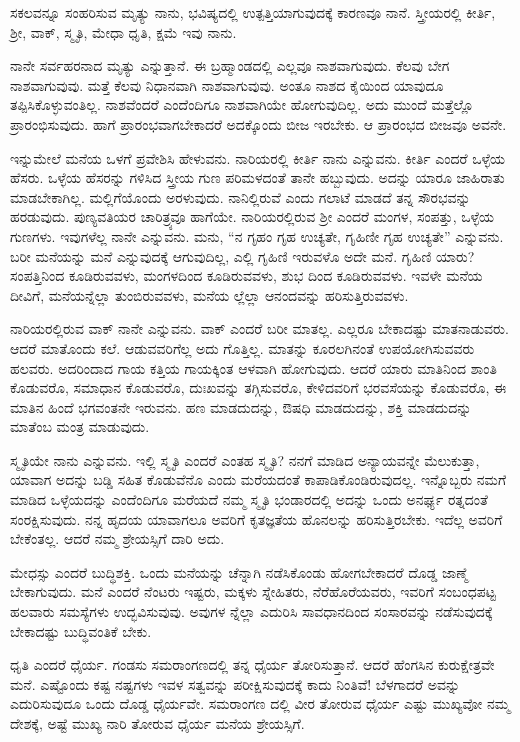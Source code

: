 {\small ಸಕಲವನ್ನೂ ಸಂಹರಿಸುವ ಮೃತ್ಯು ನಾನು, ಭವಿಷ್ಯದಲ್ಲಿ ಉತ್ಪತ್ತಿಯಾಗುವುದಕ್ಕೆ ಕಾರಣವೂ ನಾನೆ. ಸ್ತ್ರೀಯರಲ್ಲಿ ಕೀರ್ತಿ, ಶ್ರೀ, ವಾಕ್, ಸ್ಮೃತಿ, ಮೇಧಾ ಧೃತಿ, ಕ್ಷಮೆ ಇವು ನಾನು.}

ನಾನೇ ಸರ್ವಹರನಾದ ಮೃತ್ಯು ಎನ್ನುತ್ತಾನೆ. ಈ ಬ್ರಹ್ಮಾಂಡದಲ್ಲಿ ಎಲ್ಲವೂ ನಾಶವಾಗುವುದು. ಕೆಲವು ಬೇಗ ನಾಶವಾಗುವುವು. ಮತ್ತೆ ಕೆಲವು ನಿಧಾನವಾಗಿ ನಾಶವಾಗುವುವು. ಅಂತೂ ನಾಶದ ಕೈಯಿಂದ ಯಾವುದೂ ತಪ್ಪಿಸಿಕೊಳ್ಳುವಂತಿಲ್ಲ. ನಾಶವೆಂದರೆ ಎಂದೆಂದಿಗೂ ನಾಶವಾಗಿಯೇ ಹೋಗುವುದಿಲ್ಲ. ಅದು ಮುಂದೆ ಮತ್ತೆಲ್ಲೊ ಪ್ರಾರಂಭಿಸುವುದು. ಹಾಗೆ ಪ್ರಾರಂಭವಾಗಬೇಕಾದರೆ ಅದಕ್ಕೊಂದು ಬೀಜ ಇರಬೇಕು. ಆ ಪ್ರಾರಂಭದ ಬೀಜವೂ ಅವನೇ.

ಇನ್ನುಮೇಲೆ ಮನೆಯ ಒಳಗೆ ಪ್ರವೇಶಿಸಿ ಹೇಳುವನು. ನಾರಿಯರಲ್ಲಿ ಕೀರ್ತಿ ನಾನು ಎನ್ನುವನು. ಕೀರ್ತಿ ಎಂದರೆ ಒಳ್ಳೆಯ ಹೆಸರು. ಒಳ್ಳೆಯ ಹೆಸರನ್ನು ಗಳಿಸಿದ ಸ್ತ್ರೀಯ ಗುಣ ಪರಿಮಳದಂತೆ ತಾನೇ ಹಬ್ಬುವುದು. ಅದನ್ನು ಯಾರೂ ಜಾಹಿರಾತು ಮಾಡಬೇಕಾಗಿಲ್ಲ. ಮಲ್ಲಿಗೆಯೊಂದು ಅರಳುವುದು. ನಾನಿಲ್ಲಿರುವೆ ಎಂದು ಗಲಾಟೆ ಮಾಡದೆ ತನ್ನ ಸೌರಭವನ್ನು ಹರಡುವುದು. ಪುಣ್ಯವತಿಯರ ಚಾರಿತ್ರ್ಯವೂ ಹಾಗೆಯೇ. ನಾರಿಯರಲ್ಲಿರುವ ಶ್ರೀ ಎಂದರೆ ಮಂಗಳ, ಸಂಪತ್ತು, ಒಳ್ಳೆಯ ಗುಣಗಳು. ಇವುಗಳೆಲ್ಲ ನಾನೇ ಎನ್ನುವನು. ಮನು, “ನ ಗೃಹಂ ಗೃಹ ಉಚ್ಯತೇ, ಗೃಹಿಣೀ ಗೃಹ ಉಚ್ಯತೇ” ಎನ್ನುವನು. ಬರೀ ಮನೆಯನ್ನು ಮನೆ ಎನ್ನುವುದಕ್ಕೆ ಆಗುವುದಿಲ್ಲ, ಎಲ್ಲಿ ಗೃಹಿಣಿ ಇರುವಳೊ ಅದೇ ಮನೆ. ಗೃಹಿಣಿ ಯಾರು? ಸಂಪತ್ತಿನಿಂದ ಕೂಡಿರುವವಳು, ಮಂಗಳದಿಂದ ಕೂಡಿರುವವಳು, ಶುಭ ದಿಂದ ಕೂಡಿರುವವಳು. ಇವಳೇ ಮನೆಯ ದೀವಿಗೆ, ಮನೆಯನ್ನೆಲ್ಲಾ ತುಂಬಿರುವವಳು, ಮನೆಯ ಲ್ಲೆಲ್ಲಾ ಆನಂದವನ್ನು ಹರಿಸುತ್ತಿರುವವಳು.

ನಾರಿಯರಲ್ಲಿರುವ ವಾಕ್ ನಾನೇ ಎನ್ನುವನು. ವಾಕ್ ಎಂದರೆ ಬರೀ ಮಾತಲ್ಲ. ಎಲ್ಲರೂ ಬೇಕಾದಷ್ಟು ಮಾತನಾಡುವರು. ಆದರೆ ಮಾತೊಂದು ಕಲೆ. ಆಡುವವರಿಗೆಲ್ಲ ಅದು ಗೊತ್ತಿಲ್ಲ. ಮಾತನ್ನು ಕೂರಲಗಿನಂತೆ ಉಪಯೋಗಿಸುವವರು ಹಲವರು. ಅದರಿಂದಾದ ಗಾಯ ಕತ್ತಿಯ ಗಾಯಕ್ಕಿಂತ ಆಳವಾಗಿ ಹೋಗುವುದು. ಆದರೆ ಯಾರು ಮಾತಿನಿಂದ ಶಾಂತಿ ಕೊಡುವರೊ, ಸಮಾಧಾನ ಕೊಡುವರೊ, ದುಃಖವನ್ನು ತಗ್ಗಿಸುವರೊ, ಕೇಳಿದವರಿಗೆ ಭರವಸೆಯನ್ನು ಕೊಡುವರೊ, ಈ ಮಾತಿನ ಹಿಂದೆ ಭಗವಂತನೇ ಇರುವನು. ಹಣ ಮಾಡದುದನ್ನು, ಔಷಧಿ ಮಾಡದುದನ್ನು, ಶಕ್ತಿ ಮಾಡದುದನ್ನು ಮಾತೆಂಬ ಮಂತ್ರ ಮಾಡುವುದು.

ಸ್ಮೃತಿಯೇ ನಾನು ಎನ್ನುವನು. ಇಲ್ಲಿ ಸ್ಮೃತಿ ಎಂದರೆ ಎಂತಹ ಸ್ಮೃತಿ? ನನಗೆ ಮಾಡಿದ ಅನ್ಯಾಯವನ್ನೇ ಮೆಲುಕುತ್ತಾ, ಯಾವಾಗ ಅದನ್ನು ಬಡ್ಡಿ ಸಹಿತ ಕೊಡುವೆನೊ ಎಂದು ಮರೆಯದಂತೆ ಕಾಪಾಡಿಕೊಂಡಿರುವುದಲ್ಲ. ಇನ್ನೊಬ್ಬರು ನಮಗೆ ಮಾಡಿದ ಒಳ್ಳೆಯದನ್ನು ಎಂದೆಂದಿಗೂ ಮರೆಯದೆ ನಮ್ಮ ಸ್ಮೃತಿ ಭಂಡಾರದಲ್ಲಿ ಅದನ್ನು ಒಂದು ಅನರ್ಘ್ಯ ರತ್ನದಂತೆ ಸಂರಕ್ಷಿಸುವುದು. ನನ್ನ ಹೃದಯ ಯಾವಾಗಲೂ ಅವರಿಗೆ ಕೃತಜ್ಞತೆಯ ಹೊನಲನ್ನು ಹರಿಸುತ್ತಿರಬೇಕು. ಇದೆಲ್ಲ ಅವರಿಗೆ ಬೇಕೆಂತಲ್ಲ. ಆದರೆ ನಮ್ಮ ಶ್ರೇಯಸ್ಸಿಗೆ ದಾರಿ ಅದು.

ಮೇಧಸ್ಸು ಎಂದರೆ ಬುದ್ಧಿಶಕ್ತಿ. ಒಂದು ಮನೆಯನ್ನು ಚೆನ್ನಾಗಿ ನಡೆಸಿಕೊಂಡು ಹೋಗಬೇಕಾದರೆ ದೊಡ್ಡ ಜಾಣ್ಮೆ ಬೇಕಾಗುವುದು. ಮನೆ ಎಂದರೆ ನೆಂಟರು ಇಷ್ಟರು, ಮಕ್ಕಳು ಸ್ನೇಹಿತರು, ನೆರೆಹೊರೆಯವರು, ಇವರಿಗೆ ಸಂಬಂಧಪಟ್ಟ ಹಲವಾರು ಸಮಸ್ಯೆಗಳು ಉದ್ಭವಿಸುವುವು. ಅವುಗಳ ನ್ನೆಲ್ಲಾ ಎದುರಿಸಿ ಸಾವಧಾನದಿಂದ ಸಂಸಾರವನ್ನು ನಡೆಸುವುದಕ್ಕೆ ಬೇಕಾದಷ್ಟು ಬುದ್ಧಿವಂತಿಕೆ ಬೇಕು.

ಧೃತಿ ಎಂದರೆ ಧೈರ್ಯ. ಗಂಡಸು ಸಮರಾಂಗಣದಲ್ಲಿ ತನ್ನ ಧೈರ್ಯ ತೋರಿಸುತ್ತಾನೆ. ಆದರೆ ಹೆಂಗಸಿನ ಕುರುಕ್ಷೇತ್ರವೇ ಮನೆ. ಎಷ್ಟೊಂದು ಕಷ್ಟ ನಷ್ಟಗಳು ಇವಳ ಸತ್ವವನ್ನು ಪರೀಕ್ಷಿಸುವುದಕ್ಕೆ ಕಾದು ನಿಂತಿವೆ! ಬೆಳಗಾದರೆ ಅವನ್ನು ಎದುರಿಸುವುದೂ ಒಂದು ದೊಡ್ಡ ಧೈರ್ಯವೇ. ಸಮರಾಂಗಣ ದಲ್ಲಿ ವೀರ ತೋರುವ ಧೈರ್ಯ ಎಷ್ಟು ಮುಖ್ಯವೋ ನಮ್ಮ ದೇಶಕ್ಕೆ, ಅಷ್ಟೆ ಮುಖ್ಯ ನಾರಿ ತೋರುವ ಧೈರ್ಯ ಮನೆಯ ಶ್ರೇಯಸ್ಸಿಗೆ. 

